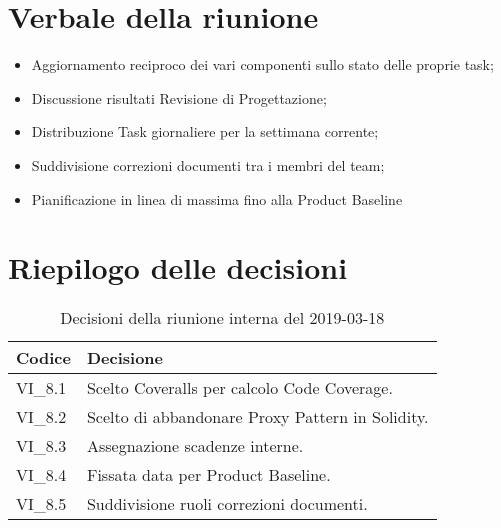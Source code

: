 \section{Verbale della riunione}
\begin{itemize}
	\item Aggiornamento reciproco dei vari componenti sullo stato delle proprie 
	task;
	\item Discussione risultati Revisione di Progettazione;
	\item Distribuzione Task giornaliere per la settimana corrente;
	\item Suddivisione correzioni documenti tra i membri del team;
	\item Pianificazione in linea di massima fino alla Product Baseline
	
\end{itemize}

\hspace{3cm}

\section{Riepilogo delle decisioni}

	
	\begin{longtable}{ >{\centering}p{} >{}p{}}
		\caption{Decisioni della riunione interna del 2019-03-18}\\	
		\rowcolorhead
		\textbf{\color{white}Codice} 
		& \centering\textbf{\color{white}Decisione} 
		\tabularnewline 
		\endfirsthead
		VI\_8.1 & Scelto Coveralls per calcolo Code Coverage.
		\tabularnewline 
		VI\_8.2 & Scelto di abbandonare Proxy Pattern in Solidity.
		\tabularnewline 
		VI\_8.3 & Assegnazione scadenze interne.
		\tabularnewline 
		VI\_8.4 & Fissata data per Product Baseline.
		\tabularnewline
		VI\_8.5 & Suddivisione ruoli correzioni documenti.
		
	\end{longtable}
	




